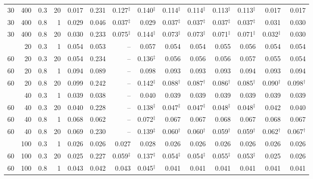 \begin{tabular}{@{}rrrrrrrrrrrrrr@{}}
30 & 400 & 0.3 & 20 & 0.017 & 0.231 & 0.127$^{\ddagger}$ & 0.140$^{\ddagger}$ & 0.114$^{\ddagger}$ & 0.114$^{\ddagger}$ & 0.113$^{\ddagger}$ & 0.113$^{\ddagger}$ & 0.017 & 0.017 \\
30 & 400 & 0.8 & 1 & 0.029 & 0.046 & 0.037$^{\ddagger}$ & 0.029 & 0.037$^{\ddagger}$ & 0.037$^{\ddagger}$ & 0.037$^{\ddagger}$ & 0.037$^{\ddagger}$ & 0.031 & 0.030 \\
30 & 400 & 0.8 & 20 & 0.030 & 0.233 & 0.075$^{\ddagger}$ & 0.144$^{\ddagger}$ & 0.073$^{\ddagger}$ & 0.073$^{\ddagger}$ & 0.071$^{\ddagger}$ & 0.071$^{\ddagger}$ & 0.032$^{\ddagger}$ & 0.030 \\
\addlinespace[1pt]
60 & 20 & 0.3 & 1 & 0.054 & 0.053 & -- & 0.057 & 0.054 & 0.054 & 0.055 & 0.056 & 0.054 & 0.054 \\
60 & 20 & 0.3 & 20 & 0.054 & 0.234 & -- & 0.136$^{\ddagger}$ & 0.056 & 0.056 & 0.056 & 0.057 & 0.055 & 0.054 \\
60 & 20 & 0.8 & 1 & 0.094 & 0.089 & -- & 0.098 & 0.093 & 0.093 & 0.093 & 0.094 & 0.093 & 0.094 \\
60 & 20 & 0.8 & 20 & 0.099 & 0.242 & -- & 0.142$^{\ddagger}$ & 0.088$^{\dagger}$ & 0.087$^{\dagger}$ & 0.086$^{\dagger}$ & 0.085$^{\dagger}$ & 0.090$^{\dagger}$ & 0.098$^{\dagger}$ \\
\addlinespace[1pt]
60 & 40 & 0.3 & 1 & 0.039 & 0.038 & -- & 0.040 & 0.039 & 0.039 & 0.039 & 0.039 & 0.039 & 0.039 \\
60 & 40 & 0.3 & 20 & 0.040 & 0.228 & -- & 0.138$^{\ddagger}$ & 0.047$^{\ddagger}$ & 0.047$^{\ddagger}$ & 0.048$^{\ddagger}$ & 0.048$^{\ddagger}$ & 0.042 & 0.040 \\
60 & 40 & 0.8 & 1 & 0.068 & 0.062 & -- & 0.072$^{\ddagger}$ & 0.067 & 0.067 & 0.068 & 0.067 & 0.068 & 0.067 \\
60 & 40 & 0.8 & 20 & 0.069 & 0.230 & -- & 0.139$^{\ddagger}$ & 0.060$^{\dagger}$ & 0.060$^{\dagger}$ & 0.059$^{\dagger}$ & 0.059$^{\dagger}$ & 0.062$^{\dagger}$ & 0.067$^{\dagger}$ \\
\addlinespace[1pt]
60 & 100 & 0.3 & 1 & 0.026 & 0.026 & 0.027 & 0.028 & 0.026 & 0.026 & 0.026 & 0.026 & 0.026 & 0.026 \\
60 & 100 & 0.3 & 20 & 0.025 & 0.227 & 0.059$^{\ddagger}$ & 0.137$^{\ddagger}$ & 0.054$^{\ddagger}$ & 0.054$^{\ddagger}$ & 0.055$^{\ddagger}$ & 0.053$^{\ddagger}$ & 0.025 & 0.026 \\
60 & 100 & 0.8 & 1 & 0.043 & 0.042 & 0.043 & 0.045$^{\ddagger}$ & 0.041 & 0.041 & 0.041 & 0.041 & 0.041 & 0.041 \\

\end{tabular}
